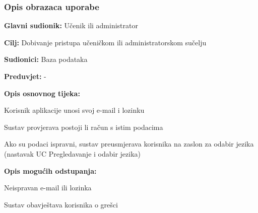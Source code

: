\subsubsection{Opis obrazaca uporabe}

\noindent {}
\begin{packed_item}

	\item \textbf{Glavni sudionik: } Učenik ili administrator
	\item \textbf{Cilj: } Dobivanje pristupa učeničkom ili administratorskom sučelju
	\item \textbf{Sudionici: } Baza podataka
	\item \textbf{Preduvjet: } -
	\item  \textbf{Opis osnovnog tijeka:}
	
	\item[] \begin{packed_enum}

		\item Korisnik aplikacije unosi svoj e-mail i lozinku
		\item Sustav provjerava postoji li račun s istim podacima
		\item Ako su podaci ispravni, sustav preusmjerava korisnika na zaslon za odabir jezika (nastavak UC Pregledavanje i odabir jezika)

	\end{packed_enum}
	
	\item  \textbf{Opis mogućih odstupanja:}
	
	\item[] \begin{packed_item}

		\item[2.a] Neispravan e-mail ili lozinka
		\item[] \begin{packed_enum}
			
			\item Sustav obavještava korisnika o grešci
			
		\end{packed_enum}
		
	\end{packed_item}
\end{packed_item}


